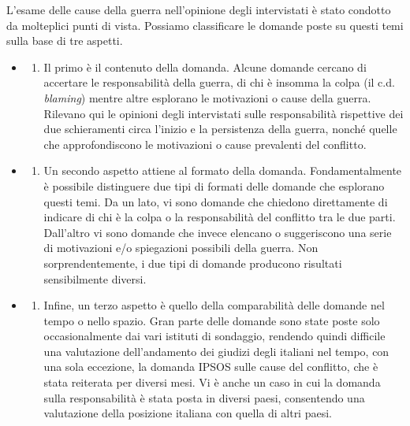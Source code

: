 \documentclass[
  openany]{book}
\providecommand{\tightlist}{%
  \setlength{\itemsep}{0pt}\setlength{\parskip}{0pt}}
\begin{document}
L'esame delle cause della guerra nell'opinione degli intervistati è stato condotto da molteplici punti di vista. Possiamo classificare le domande poste su questi temi sulla base di tre aspetti.

\begin{itemize}
\item
  \begin{enumerate}
  \def\labelenumi{\alph{enumi})}
  \tightlist
  \item
    Il primo è il contenuto della domanda. Alcune domande cercano di accertare le responsabilità della guerra, di chi è insomma la colpa (il c.d. \emph{blaming}) mentre altre esplorano le motivazioni o cause della guerra. Rilevano qui le opinioni degli intervistati sulle responsabilità rispettive dei due schieramenti circa l'inizio e la persistenza della guerra, nonché quelle che approfondiscono le motivazioni o cause prevalenti del conflitto.
  \end{enumerate}
\item
  \begin{enumerate}
  \def\labelenumi{\alph{enumi})}
  \setcounter{enumi}{1}
  \tightlist
  \item
    Un secondo aspetto attiene al formato della domanda. Fondamentalmente è possibile distinguere due tipi di formati delle domande che esplorano questi temi. Da un lato, vi sono domande che chiedono direttamente di indicare di chi è la colpa o la responsabilità del conflitto tra le due parti. Dall'altro vi sono domande che invece elencano o suggeriscono una serie di motivazioni e/o spiegazioni possibili della guerra. Non sorprendentemente, i due tipi di domande producono risultati sensibilmente diversi.
  \end{enumerate}
\item
  \begin{enumerate}
  \def\labelenumi{\alph{enumi})}
  \setcounter{enumi}{2}
  \tightlist
  \item
    Infine, un terzo aspetto è quello della comparabilità delle domande nel tempo o nello spazio. Gran parte delle domande sono state poste solo occasionalmente dai vari istituti di sondaggio, rendendo quindi difficile una valutazione dell'andamento dei giudizi degli italiani nel tempo, con una sola eccezione, la domanda IPSOS sulle cause del conflitto, che è stata reiterata per diversi mesi. Vi è anche un caso in cui la domanda sulla responsabilità è stata posta in diversi paesi, consentendo una valutazione della posizione italiana con quella di altri paesi.
  \end{enumerate}
\end{itemize}
\end{document}
